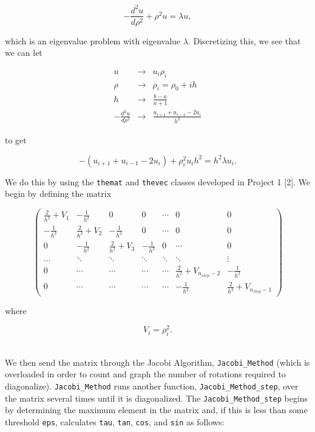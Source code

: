 \documentclass[12pt]{article}
\numberwithin{equation}{section}
\begin{document}
$$-\frac{d^{2}u}{d\rho^{2}}+\rho^{2}u=\lambda u,$$

\noindent which is an eigenvalue problem with eigenvalue $\lambda$.  Discretizing this, we see that we can let

$$\begin{array}{ccc}
u & \rightarrow & u_{i}\rho_{i} \\
\rho & \rightarrow & \rho_{i}=\rho_{0}+ih \\
h & \rightarrow & \frac{b-a}{n+1} \\
-\frac{d^{2}u}{d\rho^{2}} & \rightarrow & \frac{u_{i+1}+u_{i-1}-2u_{i}}{h^{2}}
\end{array}$$

\noindent to get

\begin{equation}
\label{eq:alg1}
-\left(u_{i+1}+u_{i-1}-2u_{i}\right)+\rho_{i}^{2}u_{i}h^{2}=h^{2}\lambda u_{i}.
\end{equation}

\noindent We do this by using the \texttt{themat} and \texttt{thevec} classes developed in Project 1 [2].  We begin by defining the matrix 

$$\left(\begin{array}{ccccccc}
\frac{2}{h^{2}}+V_1 & -\frac{1}{h^2} & 0 & 0 & \cdots & 0 & 0 \\
-\frac{1}{h^2} & \frac{2}{h^2}+V_2 & -\frac{1}{h^2} & 0 & \cdots & 0 & 0 \\
0 & -\frac{1}{h^2} & \frac{2}{h^2}+V_3 & -\frac{1}{h^2} & 0 & \cdots & 0 \\
\ldots & \ddots & \ddots & \ddots & \ddots & \ddots & \vdots \\
0 & \cdots & \cdots & \cdots & \cdots & \frac{2}{h^2}+V_{n_{step}-2} & -\frac{1}{h^2} \\
0 & \cdots & \cdots & \cdots & \cdots & -\frac{1}{h^2} & \frac{2}{h^2}+V_{n_{step}-1} 
\end{array}\right)$$

\noindent where

$$V_{i}=\rho_{i}^{2}.$$

\\\indent We then send the matrix through the Jacobi Algorithm, \texttt{Jacobi\_Method} (which is overloaded in order to count and graph the number of rotations required to diagonalize).  \texttt{Jacobi\_Method} runs another function, \texttt{Jacobi\_Method\_step}, over the matrix several times until it is diagonalized.  The \texttt{Jacobi\_Method\_step} begins by determining the maximum element in the matrix and, if this is less than some threshold \texttt{eps}, calculates \texttt{tau}, \texttt{tan}, \texttt{cos}, and \texttt{sin} as follows:
\end{document}
